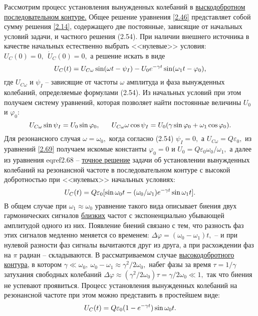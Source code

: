 {Рассмотрим процесс установления вынужденных колебаний в \underline{выскодобротном последовательном контуре.} Общее решение уравнения \eqref{2.46} представляет собой сумму решения \eqref{2.14}, содержащего две постоянные, зависящие от начальных условий задачи, и частного решения (2.54). При наличии внешнего источника в качестве начальных естественно выбрать <<нулевые>> условия: $U_C(0)=0,~~\dot U_C(0)=0,$ а решение искать в виде
\begin{equation}
	\eqmark{2.68}
	U_C(t)=U_{C\omega}\sin(\omega t-\psi_I)-U_0e^{-\gamma t}\sin(\omega_1t-\varphi_0),
\end{equation}
где $U_{C\omega}$ и $\psi_I$ – зависящие от частоты $\omega$ амплитуда и фаза вынужденных колебаний, определяемые формулами (2.54). Из начальных условий при этом получаем систему уравнений, которая позволяет найти постоянные величины $U_0$ и $\varphi_0:$
\begin{equation}
	\eqmark{2.69}
	U_{C\omega}\sin\psi_I=U_0\sin\varphi_0,~~~~~U_{C\omega}\omega\cos\psi_I=U_0(\gamma\sin\varphi_0+\omega_1\cos\varphi_0).
\end{equation}
Для резонансного случая $\omega=\omega_0,$ когда согласно (2.54) $\psi_I=0,$ а $U_{C\omega}=Q\varepsilon_0,$ из уравнений \eqref{2.69} получаем искомые константы $\varphi_0=0$ и $U_0=Q\varepsilon_0\omega_0/\omega_1,$ а далее из уравнения eqref{2.68} – \underline{точное решение} задачи об установлении вынужденных колебаний на резонансной частоте в последовательном контуре с высокой добротностью при <<нулевых>> начальных условиях:
\begin{equation}
	\eqmark{2.70}
	U_{C}(t)=Q\varepsilon_0[\sin\omega_0t-(\omega_0/\omega_1)e^{-\gamma t}\sin\omega_1 t].
\end{equation}
В общем случае при $\omega_1\approx\omega_0$ уравнение такого вида описывает \textsf{биения} двух гармонических сигналов \underline{близких} частот с экспоненциально убывающей амплитудой одного из них. Появление биений связано с тем, что разность фаз этих сигналов медленно меняется со временем: $\Delta\varphi=(\omega_0-\omega_1)t,$ – и при нулевой разности фаз сигналы вычитаются друг из друга, а при расхождении фаз на $\pi$ радиан – складываются. В рассматриваемом случае \underline{высокодобротного контура,} в котором $\gamma\ll\omega_0,~\omega_0-\omega_1\approx\gamma^2/2\omega_0,$ набег фазы за время $\tau=1/\gamma$ затухания свободных колебаний $\Delta\varphi\approx(\gamma^2/2\omega_0)\tau=\gamma/2\omega_0\ll1,$  так что биения не успевают проявиться. Процесс установления вынужденных колебаний на резонансной частоте при этом можно представить в простейшем виде:
\begin{equation}\eqmark{2.71}
	U_C(t)=Q\varepsilon_0(1-e^{-\gamma t})\sin\omega_0 t.
\end{equation}

}
